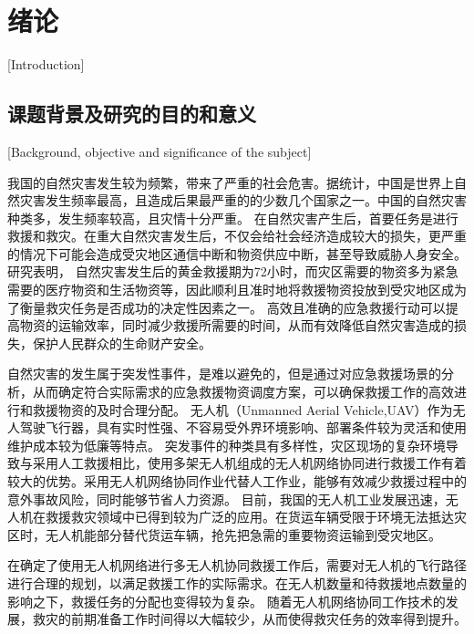 
\chapter{绪论}[Introduction]

\section{课题背景及研究的目的和意义}[Background, objective and significance of the subject]

我国的自然灾害发生较为频繁，带来了严重的社会危害。据统计，中国是世界上自然灾害发生频率最高，且造成后果最严重的的少数几个国家之一\cite{ziranzaihaifangzhide}。中国的自然灾害种类多，发生频率较高，且灾情十分严重。
在自然灾害产生后，首要任务是进行救援和救灾。在重大自然灾害发生后，不仅会给社会经济造成较大的损失，更严重的情况下可能会造成受灾地区通信中断和物资供应中断，甚至导致威胁人身安全。研究表明，
自然灾害发生后的黄金救援期为72小时，而灾区需要的物资多为紧急需要的医疗物资和生活物资等，因此顺利且准时地将救援物资投放到受灾地区成为了衡量救灾任务是否成功的决定性因素之一\cite{yuqingqing}。
高效且准确的应急救援行动可以提高物资的运输效率，同时减少救援所需要的时间，从而有效降低自然灾害造成的损失，保护人民群众的生命财产安全。


自然灾害的发生属于突发性事件，是难以避免的，但是通过对应急救援场景的分析，从而确定符合实际需求的应急救援物资调度方案，可以确保救援工作的高效进行和救援物资的及时合理分配。
无人机（Unmanned Aerial Vehicle,UAV）作为无人驾驶飞行器，具有实时性强、不容易受外界环境影响、部署条件较为灵活和使用维护成本较为低廉等特点。
突发事件的种类具有多样性，灾区现场的复杂环境导致与采用人工救援相比，使用多架无人机组成的无人机网络协同进行救援工作有着较大的优势。采用无人机网络协同作业代替人工作业，能够有效减少救援过程中的意外事故风险，同时能够节省人力资源。
目前，我国的无人机工业发展迅速，无人机在救援救灾领域中已得到较为广泛的应用。在货运车辆受限于环境无法抵达灾区时，无人机能部分替代货运车辆，抢先把急需的重要物资运输到受灾地区\cite{liuyajing}。


在确定了使用无人机网络进行多无人机协同救援工作后，需要对无人机的飞行路径进行合理的规划，以满足救援工作的实际需求。在无人机数量和待救援地点数量的影响之下，救援任务的分配也变得较为复杂。
随着无人机网络协同工作技术的发展，救灾的前期准备工作时间得以大幅较少，从而使得救灾任务的效率得到提升。


